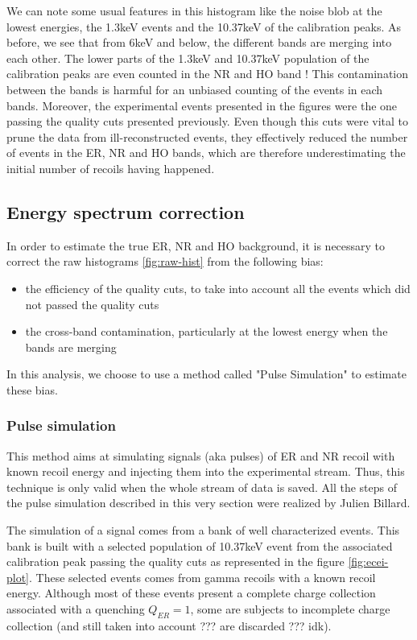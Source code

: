 We can note some usual features in this histogram like the noise blob at the lowest energies, the 1.3keV events and the 10.37keV of the calibration peaks. As before, we see that from 6keV and below, the different bands are merging into each other. The lower parts of the 1.3keV and 10.37keV population of the calibration peaks are even counted in the NR and HO band !
This contamination between the bands is harmful for an unbiased counting of the events in each bands.
Moreover, the experimental events presented in the figures were the one passing the quality cuts presented previously. Even though this cuts were vital to prune the data from ill-reconstructed events, they effectively reduced the number of events in the ER, NR and HO bands, which are therefore underestimating the initial number of recoils having happened.


\subsection{Energy spectrum correction}

In order to estimate the true ER, NR and HO background, it is necessary to correct the raw histograms \ref{fig:raw-hist} from the following bias:
\begin{itemize}
	\item the efficiency of the quality cuts, to take into account all the events which did not passed the quality cuts
	\item the cross-band contamination, particularly at the lowest energy when the bands are merging
\end{itemize}
In this analysis, we choose to use a method called "Pulse Simulation" to estimate these bias.


\subsubsection{Pulse simulation}

This method aims at simulating signals (aka pulses) of ER and NR recoil with known recoil energy and injecting them into the experimental stream. Thus, this technique is only valid when the whole stream of data is saved. All the steps of the pulse simulation described in this very section were realized by Julien Billard.

The simulation of a signal comes from a bank of well characterized events. This bank is built with a selected population of 10.37keV event from the associated calibration peak passing the quality cuts as represented in the figure \ref{fig:ecei-plot}. These selected events comes from gamma recoils with a known recoil energy. Although most of these events present a complete charge collection associated with a quenching $Q_{ER}=1$, some are subjects to incomplete charge collection (and still taken into account ??? are discarded ??? idk).

